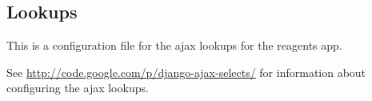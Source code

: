 \documentclass[letterpaper,10pt,english]{sphinxmanual}
\begin{document}

\begin{fulllineitems}
\label{api:experimentdb.reagents.views.index}
\end{fulllineitems}



\subsection{Lookups}
\label{api:id24}\label{api:module-experimentdb.reagents.lookups}
This is a configuration file for the ajax lookups for the reagents app.


See \href{http://code.google.com/p/django-ajax-selects/}{http://code.google.com/p/django-ajax-selects/} for information about configuring the ajax lookups.

\end{document}
